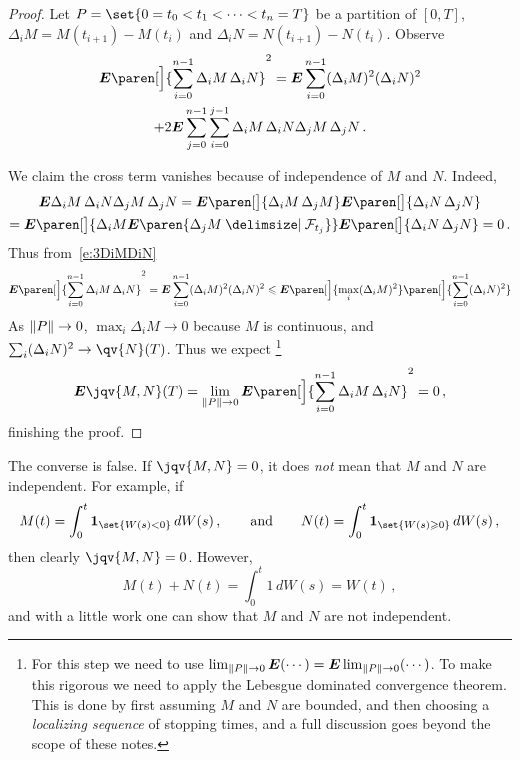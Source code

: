\begin{proof}
  Let $P = \set{0 = t_0 < t_1 < \cdots < t_n = T}$ be a partition of $[0,T]$, $\Delta_i M = M(t_{i+1}) - M(t_i)$ and $\Delta_i N = N(t_{i+1}) - N(t_i)$.
  Observe
  \begin{multline}\label{e:3DiMDiN}
    \E \paren[\Big]{ \sum_{i=0}^{n-1} \Delta_i M \, \Delta_i N }^2
      = \E \sum_{i = 0}^{n-1} (\Delta_i M)^2 (\Delta_i N)^2
      \\
	+ 2 \E \sum_{j=0}^{n-1} \sum_{i=0}^{j-1} \Delta_i M \, \Delta_i N \Delta_j M \, \Delta_j N\,.
  \end{multline}

  We claim the cross term vanishes because of independence of $M$ and $N$.
  Indeed,
  \begin{multline*}
    \E \Delta_i M \, \Delta_i N \Delta_j M \, \Delta_j N
      = \E \paren[\big]{\Delta_i M \, \Delta_j M } 
	\E \paren[\big]{\Delta_i N \, \Delta_j N }
      \\
      = \E \paren[\big]{\Delta_i M \E \paren{ \Delta_j M \given \mathcal F_{t_j} } }
	\E \paren[\big]{\Delta_i N \, \Delta_j N }
      = 0\,.
  \end{multline*}
  Thus from~\eqref{e:3DiMDiN}
  \begin{equation*}
    \E \paren[\Big]{ \sum_{i=0}^{n-1} \Delta_i M \, \Delta_i N }^2
      = \E \sum_{i = 0}^{n-1} (\Delta_i M)^2 (\Delta_i N)^2
      \leq \E \paren[\Big]{ \max_i (\Delta_i M)^2} \paren[\Big]{ \sum_{i = 0}^{n-1} (\Delta_i N)^2 }
  \end{equation*}
  As $\lVert P\rVert \to 0$, $\max_i \Delta_i M \to 0$ because $M$ is continuous, and $\sum_i (\Delta_i N)^2 \to \qv{N}(T)$.
  Thus we expect%
  \footnote{%
    For this step we need to use $\lim_{\lVert P\rVert \to 0} \bm{E} (\cdots) = \bm{E} \lim_{\lVert P\rVert \to 0} (\cdots)$.
    To make this rigorous we need to apply the Lebesgue dominated convergence theorem.
    This is done by first assuming $M$ and $N$ are bounded, and then choosing a \emph{localizing sequence} of stopping times, and a full discussion goes beyond the scope of these notes.
  }
  \begin{equation*}
    \E \jqv{M,N}(T)
      = \lim_{\norm{P} \to 0} \E \paren[\Big]{ \sum_{i=0}^{n-1} \Delta_i M \, \Delta_i N }^2
      = 0\,,
  \end{equation*}
  finishing the proof.
\end{proof}
\begin{remark}
  The converse is false.
  If $\jqv{M,N} = 0$, it does \emph{not} mean that $M$ and $N$ are independent.
  For example, if
  \begin{equation*}
    M(t) = \int_0^t \one_{\set{W(s) < 0}} \, dW(s)\,,
    \qquad\text{and}\qquad
    N(t) = \int_0^t \one_{\set{W(s) \geq 0}} \, dW(s)\,,
  \end{equation*}
  then clearly $\jqv{M,N} = 0$.
  However,
  \begin{equation*}
    M(t) + N(t) = \int_0^t 1 \, dW(s) = W(t)\,,
  \end{equation*}
  and with a little work one can show that $M$ and $N$ are not independent.
\end{remark}

